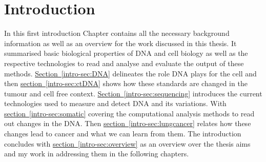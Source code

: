 \chapter{Introduction}
\label{ch:intro}

In this first introduction Chapter contains all the necessary background information as well as an overview for the work discussed in this thesis. It summarised basic biological properties of DNA and cell biology as well as the respective technologies to read and analyse and evaluate the output of these methods.
\hyperref[intro-sec:DNA]{Section~\ref*{intro-sec:DNA}} delineates the role DNA plays for the cell and then \hyperref[intro-sec:ctDNA]{section~\ref{intro-sec:ctDNA}} shows how these standards are changed in the tumour and cell free context. \hyperref[intro-sec:sequencing]{Section~\ref{intro-sec:sequencing}} introduces the current technologies used to measure and detect DNA and its variations. With \hyperref[intro-sec:somatic]{section~\ref*{intro-sec:somatic}} covering the computational analysis methods to read out changes in the DNA. Then \hyperref[intro-sec:lungcancer]{section~\ref{intro-sec:lungcancer}} relates how these changes lead to cancer and what we can learn from them. 
The introduction concludes with \hyperref[intro-sec:overview]{section~\ref*{intro-sec:overview}} as an overview over the thesis aims and my work in addressing them in the following chapters.














